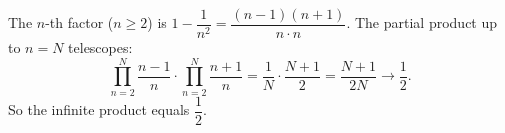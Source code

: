 The $n$-th factor ($n\ge2$) is $1-\dfrac{1}{n^2}=\dfrac{(n-1)(n+1)}{n\cdot n}$. The partial product up to $n=N$ telescopes:
\[
\prod_{n=2}^{N}\dfrac{n-1}{n}\cdot\prod_{n=2}^{N}\dfrac{n+1}{n}=\dfrac{1}{N}\cdot\dfrac{N+1}{2}=\dfrac{N+1}{2N}\to\dfrac{1}{2} .
\]
So the infinite product equals $\boxed{\dfrac{1}{2}}$.
